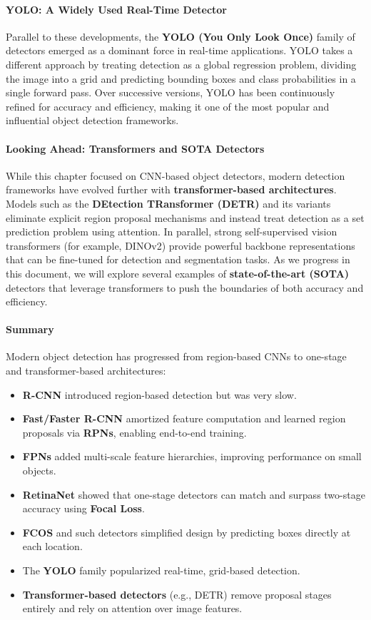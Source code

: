 \paragraph{YOLO: A Widely Used Real-Time Detector}
Parallel to these developments, the \textbf{YOLO (You Only Look Once)} family of detectors emerged as a dominant force in real-time applications. YOLO takes a different approach by treating detection as a global regression problem, dividing the image into a grid and predicting bounding boxes and class probabilities in a single forward pass. Over successive versions, YOLO has been continuously refined for accuracy and efficiency, making it one of the most popular and influential object detection frameworks.

\paragraph{Looking Ahead: Transformers and SOTA Detectors}
While this chapter focused on CNN-based object detectors, modern detection frameworks have evolved further with \textbf{transformer-based architectures}. Models such as the \textbf{DEtection TRansformer (DETR)} and its variants eliminate explicit region proposal mechanisms and instead treat detection as a set prediction problem using attention. In parallel, strong self-supervised vision transformers (for example, DINOv2) provide powerful backbone representations that can be fine-tuned for detection and segmentation tasks. As we progress in this document, we will explore several examples of \textbf{state-of-the-art (SOTA)} detectors that leverage transformers to push the boundaries of both accuracy and efficiency.

\paragraph{Summary}
Modern object detection has progressed from region-based CNNs to one-stage and transformer-based architectures:
\begin{itemize}
	\item \textbf{R-CNN} introduced region-based detection but was very slow.
	\item \textbf{Fast/Faster R-CNN} amortized feature computation and learned region proposals via \textbf{RPNs}, enabling end-to-end training.
	\item \textbf{FPNs} added multi-scale feature hierarchies, improving performance on small objects.
	\item \textbf{RetinaNet} showed that one-stage detectors can match and surpass two-stage accuracy using \textbf{Focal Loss}.
	\item \textbf{FCOS} and such detectors simplified design by predicting boxes directly at each location.
	\item The \textbf{YOLO} family popularized real-time, grid-based detection.
	\item \textbf{Transformer-based detectors} (e.g., DETR) remove proposal stages entirely and rely on attention over image features.
\end{itemize}

